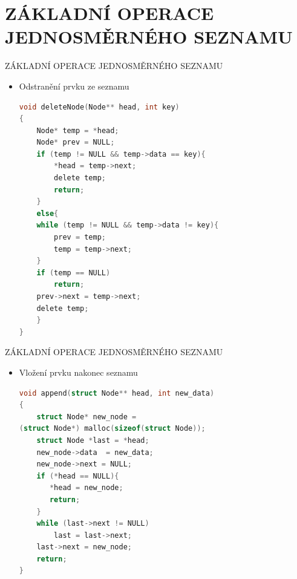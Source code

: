 \documentclass[9pt]{beamer}
\begin{document}
\section{ZÁKLADNÍ OPERACE JEDNOSMĚRNÉHO SEZNAMU}
\begin{frame}[fragile]{ZÁKLADNÍ OPERACE JEDNOSMĚRNÉHO SEZNAMU}
\begin{itemize}
\item Odstranění prvku ze seznamu
    \begin{lstlisting}[language=C]
void deleteNode(Node** head, int key)
{
    Node* temp = *head;
    Node* prev = NULL;
    if (temp != NULL && temp->data == key){
        *head = temp->next;
        delete temp;            
        return;
    }
    else{
    while (temp != NULL && temp->data != key){
        prev = temp;
        temp = temp->next;
    }
    if (temp == NULL)
        return;
    prev->next = temp->next;
    delete temp;
    }
}
    \end{lstlisting}
\end{itemize}
\end{frame}


\begin{frame}[fragile]{ZÁKLADNÍ OPERACE JEDNOSMĚRNÉHO SEZNAMU}
\begin{itemize}
\item Vložení prvku nakonec seznamu
    \begin{lstlisting}[language=C]
void append(struct Node** head, int new_data)
{
    struct Node* new_node =
(struct Node*) malloc(sizeof(struct Node));
    struct Node *last = *head;
    new_node->data  = new_data;
    new_node->next = NULL;
    if (*head == NULL){
       *head = new_node;
       return;
    }  
    while (last->next != NULL)
        last = last->next;
    last->next = new_node;
    return;    
}
    \end{lstlisting}
\end{itemize}
\end{frame}
\end{document}
